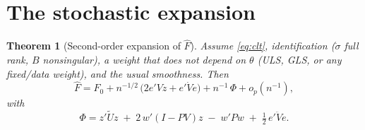 \documentclass[11pt]{article}
\theoremstyle{plain}
\newtheorem{theorem}{Theorem}
\theoremstyle{remark}
\begin{document}
\section{The stochastic expansion}

\begin{theorem}[Second-order expansion of $\hat F$]\label{thm:main}
Assume \eqref{eq:clt}, identification ($\dot\sigma$ full rank, $B$ nonsingular),
a weight that does not depend on $\theta$ (ULS, GLS, or any fixed/data weight),
and the usual smoothness. Then
\begin{equation}\label{eq:expansion}
  \hat F = F_0
  + n^{-1/2}\,\big(2e'Vz + e'\dot V e\big)
  + n^{-1}\,\Phi
  + o_p(n^{-1}),
\end{equation}
with
\begin{equation}\label{eq:Phi}
  \Phi = z'\tilde U z
       \;+\; 2\,w'(I-PV)z
       \;-\; w'Pw
       \;+\; \tfrac12\,e'\ddot V e .
\end{equation}
\end{theorem}
\end{document}
